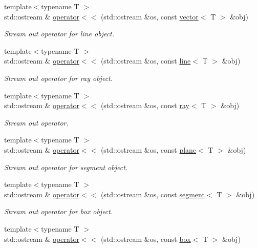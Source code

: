 \begin{DoxyCompactItemize}
{\footnotesize template$<$typename T $>$ }\\std\+::ostream \& \hyperlink{namespaceddd_a85783ffbd6985b1981059732d7bbe174}{operator$<$$<$} (std\+::ostream \&os, const \hyperlink{classddd_1_1vector}{vector}$<$ T $>$ \&obj)
\begin{DoxyCompactList}\small\item\em Stream out operator for line object. \end{DoxyCompactList}\item 
{\footnotesize template$<$typename T $>$ }\\std\+::ostream \& \hyperlink{namespaceddd_a2001eec5d960802592e1ca6a5b0dc203}{operator$<$$<$} (std\+::ostream \&os, const \hyperlink{classddd_1_1line}{line}$<$ T $>$ \&obj)
\begin{DoxyCompactList}\small\item\em Stream out operator for ray object. \end{DoxyCompactList}\item 
{\footnotesize template$<$typename T $>$ }\\std\+::ostream \& \hyperlink{namespaceddd_ae2604d6c72853dfb2595f6882cbc7a51}{operator$<$$<$} (std\+::ostream \&os, const \hyperlink{classddd_1_1ray}{ray}$<$ T $>$ \&obj)
\begin{DoxyCompactList}\small\item\em Stream out operator. \end{DoxyCompactList}\item 
{\footnotesize template$<$typename T $>$ }\\std\+::ostream \& \hyperlink{namespaceddd_af1faa02295670c7cfd7f0278e3973f84}{operator$<$$<$} (std\+::ostream \&os, const \hyperlink{classddd_1_1plane}{plane}$<$ T $>$ \&obj)
\begin{DoxyCompactList}\small\item\em Stream out operator for segment object. \end{DoxyCompactList}\item 
{\footnotesize template$<$typename T $>$ }\\std\+::ostream \& \hyperlink{namespaceddd_a59e2fa950fd945aa8b3dd550720ad3f5}{operator$<$$<$} (std\+::ostream \&os, const \hyperlink{classddd_1_1segment}{segment}$<$ T $>$ \&obj)
\begin{DoxyCompactList}\small\item\em Stream out operator for box object. \end{DoxyCompactList}\item 
{\footnotesize template$<$typename T $>$ }\\std\+::ostream \& \hyperlink{namespaceddd_af710b0f11be50190553c743ce86545a3}{operator$<$$<$} (std\+::ostream \&os, const \hyperlink{classddd_1_1box}{box}$<$ T $>$ \&obj)

\end{DoxyCompactItemize}
